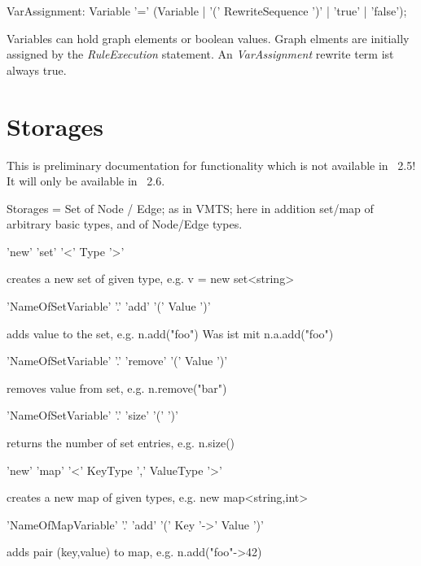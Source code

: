 \begin{rail}
  VarAssignment: Variable '=' (Variable | 
    '(' RewriteSequence ')' | 
    'true' | 
    'false');
\end{rail}\makeatother
Variables can hold graph elements or boolean values.
Graph elments are initially assigned by the \emph{RuleExecution} statement.
An \emph{VarAssignment} rewrite term ist always true.

\section{Storages}

This is preliminary documentation for functionality which is not available in \GrG~2.5! It will only be available in \GrG~2.6.

Storages = Set of Node / Edge; as in VMTS; here in addition set/map of arbitrary basic types, and of Node/Edge types.

\begin{rail}
  'new' 'set' '<' Type '>'
\end{rail}
creates a new set of given type, e.g. v = new set<string>

\begin{rail}
  'NameOfSetVariable' '.' 'add' '(' Value ')'
\end{rail}
adds value to the set, e.g. n.add("foo")
Was ist mit n.a.add("foo")

\begin{rail}
  'NameOfSetVariable' '.' 'remove' '(' Value ')'
\end{rail}
removes value from set, e.g. n.remove("bar")

\begin{rail}
  'NameOfSetVariable' '.' 'size' '(' ')'
\end{rail}
returns the number of set entries, e.g. n.size()

\begin{rail}
  'new' 'map' '<' KeyType ',' ValueType '>'
\end{rail}
creates a new map of given types, e.g. new map<string,int>

\begin{rail}
  'NameOfMapVariable' '.' 'add' '(' Key '->' Value ')'
\end{rail}
adds pair (key,value) to map, e.g. n.add("foo"->42)

